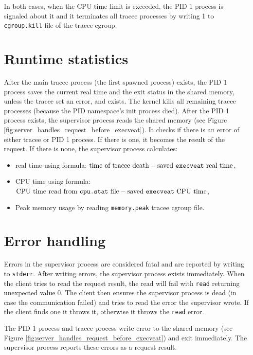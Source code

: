 \documentclass[en]{pracamgr}
\begin{document}
In both cases, when the CPU time limit is exceeded, the PID 1 process is signaled about it and it terminates all tracee processes by writing 1 to \texttt{cgroup.kill} file of the tracee cgroup.

\section{Runtime statistics}

After the main tracee process (the first spawned process) exists, the PID 1 process saves the current real time and the exit status in the shared memory, unless the tracee set an error, and exists. The kernel kills all remaining tracee processes (because the PID namespace's init process died). After the PID 1 process exists, the supervisor process reads the shared memory (see Figure \ref{fig:server_handles_request_before_execveat}). It checks if there is an error of either tracee or PID 1 process. If there is one, it becomes the result of the request. If there is none, the supervisor process calculates:
\begin{itemize}
    \item real time using formula: $\text{time of tracee death} - \text{saved \texttt{execveat} real time}$,
    \item CPU time using formula: $\text{CPU time read from \texttt{cpu.stat} file} - \text{saved \texttt{execveat} CPU time}$,
    \item Peak memory usage by reading \texttt{memory.peak} tracee cgroup file.
\end{itemize}

\section{Error handling}

Errors in the supervisor process are considered fatal and are reported by writing to \texttt{stderr}. After writing errors, the supervisor process exists immediately. When the client tries to read the request result, the read will fail with \texttt{read} returning unexpected value 0. The client then ensures the supervisor process is dead (in case the communication failed) and tries to read the error the supervisor wrote. If the client finds one it throws it, otherwise it throws the \texttt{read} error.

The PID 1 process and tracee process write error to the shared memory (see Figure \ref{fig:server_handles_request_before_execveat}) and exit immediately. The supervisor process reports these errors as a request result.
\end{document}
